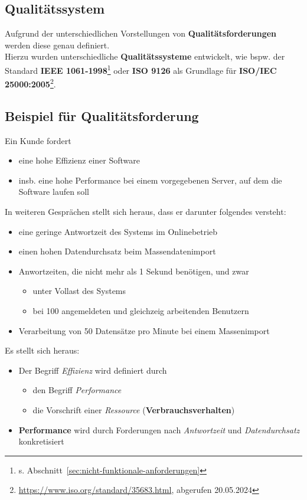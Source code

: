 \subsection*{Qualitätssystem}
Aufgrund der unterschiedlichen Vorstellungen von \textbf{Qualitätsforderungen} werden diese genau definiert.\\
Hierzu wurden unterschiedliche \textbf{Qualitätssysteme} entwickelt, wie bspw. der Standard \textbf{IEEE 1061-1998}\footnote{s. Abschnitt~\ref{sec:nicht-funktionale-anforderungen}} oder \textbf{ISO 9126} als Grundlage für \textbf{ISO/IEC 25000:2005}\footnote{
    \url{https://www.iso.org/standard/35683.html}, abgerufen 20.05.2024
}.

\subsection*{Beispiel für Qualitätsforderung}
Ein Kunde fordert
\begin{itemize}
    \item eine hohe Effizienz einer Software
    \item insb. eine hohe Performance bei einem vorgegebenen Server, auf dem die Software laufen soll
\end{itemize}

\noindent
In weiteren Gesprächen stellt sich heraus, dass er darunter folgendes versteht:

\begin{itemize}
    \item eine geringe Antwortzeit des Systems im Onlinebetrieb
    \item einen hohen Datendurchsatz beim Massendatenimport
    \item Anwortzeiten, die nicht mehr als 1 Sekund benötigen, und zwar
        \begin{itemize}
            \item unter Vollast des Systems
            \item bei 100 angemeldeten und gleichzeig arbeitenden Benutzern
        \end{itemize}
    \item Verarbeitung von 50 Datensätze pro Minute bei einem Massenimport
\end{itemize}

\noindent
Es stellt sich heraus:

\begin{itemize}
    \item Der Begriff \textit{Effizienz} wird definiert durch
    \begin{itemize}
        \item den Begriff \textit{Performance}
        \item die Vorschrift einer \textit{Ressource} (\textbf{Verbrauchsverhalten})
    \end{itemize}
    \item \textbf{Performance} wird durch Forderungen nach \textit{Antwortzeit} und \textit{Datendurchsatz} konkretisiert
\end{itemize}

